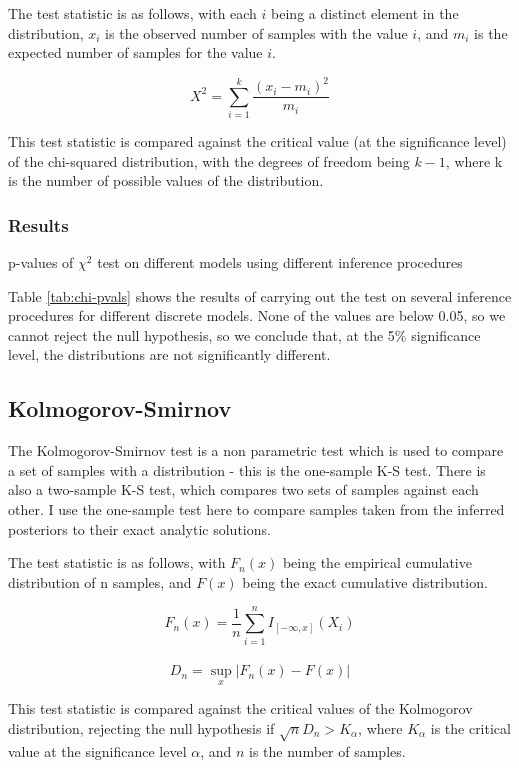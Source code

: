The test statistic is as follows, with each $i$ being a distinct element in the distribution, $x_i$ is the observed number of samples with the value $i$, and $m_i$ is the expected number of samples for the value $i$.

$$X^{2}=\sum _{i=1}^{k}{\frac {(x_{i}-m_{i})^{2}}{m_{i}}}$$

This test statistic is compared against the critical value (at the significance level) of the chi-squared distribution, with the degrees of freedom being $k-1$, where k is the number of possible values of the distribution.
\subsubsection{Results}
\begin{table}[!ht]
	\centering
	\caption{p-values of $\chi^2$ test on different models using different inference procedures}
	\label{tab:chi-pvals}
\end{table}

Table \ref{tab:chi-pvals} shows the results of carrying out the test on several inference procedures for different discrete models. None of the values are below 0.05, so we cannot reject the null hypothesis, so we conclude that, at the 5\% significance level, the distributions are not significantly different.

\subsection{Kolmogorov-Smirnov}

The Kolmogorov-Smirnov test is a non parametric test which is used to compare a set of samples with a distribution - this is the one-sample K-S test. There is also a two-sample K-S test, which compares two sets of samples against each other. I use the one-sample test here to compare samples taken from the inferred posteriors to their exact analytic solutions.

The test statistic is as follows, with $F_n(x)$ being the empirical cumulative distribution of n samples, and $F(x)$ being the exact cumulative distribution.

$$F_{n}(x)=\frac{1}{n}\sum_{i=1}^{n}I_{[-\infty ,x]}(X_{i})$$\\
$$D_{n}=\sup_{x}|F_{n}(x)-F(x)|$$

This test statistic is compared against the critical values of the Kolmogorov distribution, rejecting the null hypothesis if $\sqrt{n}D_n > K_\alpha$, where $K_\alpha$ is the critical value at the significance level $\alpha$, and $n$ is the number of samples.

